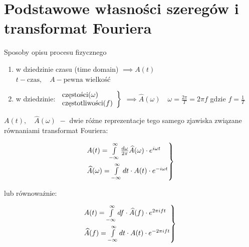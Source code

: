 
\section{Podstawowe własności szeregów i transformat Fouriera}
\begin{frame}[allowframebreaks]{Sposoby opisu procesu fizycznego}
	\begin{enumerate}
		\item w dziedzinie czasu (time domain) $ \implies A(t) $ \\
		$ t - \text{czas}, \quad A - \text{pewna wielkość} $
		\item w dziedzinie: $
		\begin{rcases*}
		\begin{array}{l}
		\text{częstości} (\omega) \\ \text{częstotliwości} (f)
		\end{array}
		\end{rcases*}$
		$\implies \widehat{A}(\omega) \quad \omega =\frac{2\pi}{T}= 2 \pi f$ gdzie $f=\frac{1}{T}$
	\end{enumerate}
	$A(t), \quad \widehat{A}(\omega) \,\, - $ dwie różne reprezentacje tego samego zjawiska związane równaniami transformat Fouriera:
	\begin{block}
	\centering
	\renewcommand{\arraystretch}{1.5}
	\setlength{\abovedisplayskip}{0pt}
	\setlength{\belowdisplayskip}{0pt}
	\setlength{\abovedisplayshortskip}{0pt}
	\setlength{\belowdisplayshortskip}{0pt}
	\[
	\begin{rcases*}
		A(t) = \int\limits_{-\infty}^{\infty}\frac{d \omega}{2\pi}\widehat{A}(\omega) \cdot e^{i \omega t} \\
		\widehat{A}(\omega) = \int\limits_{-\infty}^{\infty}dt \cdot A(t) \cdot e^{-i \omega t}
	\end{rcases*}
	\]
	\end{block}
	lub równoważnie:
	\begin{block}
	\centering
	\renewcommand{\arraystretch}{1.5}
	\setlength{\abovedisplayskip}{0pt}
	\setlength{\belowdisplayskip}{0pt}
	\setlength{\abovedisplayshortskip}{0pt}
	\setlength{\belowdisplayshortskip}{0pt}
	\[
	\begin{rcases*}
		A(t) = \int\limits_{-\infty}^{\infty}df \cdot \widehat{A}(f) \cdot e^{2 \pi ift} \\
		\widehat{A}(f) = \int\limits_{-\infty}^{\infty}dt \cdot A(t) \cdot e^{-2 \pi ift}
	\end{rcases*}
	\begin{array}{r}

\end{array}\]
\end{block}
\end{frame}
